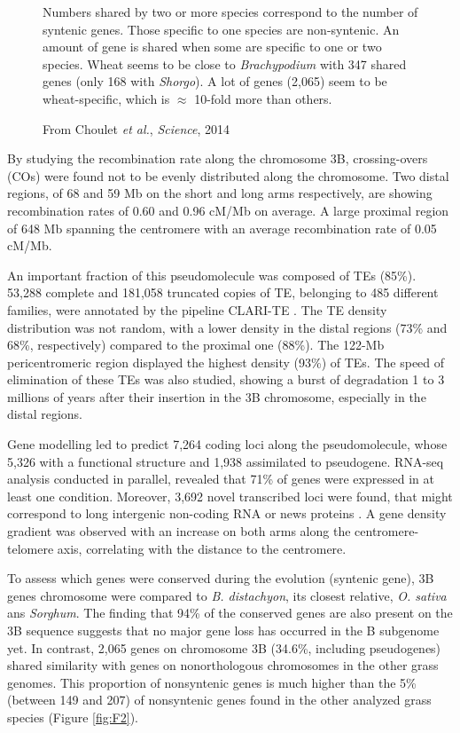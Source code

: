 \documentclass[a4paper, 12pt]{article}
\begin{document}
\begin{onehalfspace}
\begin{figure}
{    Numbers shared by two or more species correspond to the number of syntenic genes. Those specific to one species are non-syntenic. An amount of gene is shared when some are specific to one or two species. Wheat seems to be close to \textit{Brachypodium} with 347 shared genes (only 168 with \textit{Shorgo}). A lot of genes (2,065) seem to be wheat-specific, which is $\approx$ 10-fold more than others.
    
          \begin{flushright}
          From Choulet \textit{et al.}, \textit{Science}, 2014
          \end{flushright}}
    \end{figure}
\addtocounter{page}{-1}
\newpage
\clearpage %


By studying the recombination rate along the chromosome 3B, crossing-overs (COs) were found not to be evenly distributed along the chromosome. Two distal regions, of 68 and 59 Mb on the short and long arms respectively, are showing recombination rates of 0.60 and 0.96 cM/Mb on average. A large proximal region of 648 Mb spanning the centromere with an average recombination rate of 0.05 cM/Mb.

An important fraction of this pseudomolecule was composed of TEs (85\%). 53,288 complete and 181,058 truncated copies of TE, belonging to 485 different families, were annotated by the pipeline CLARI-TE \citep{Daron2014}. The TE density distribution was not random, with a lower density in the distal regions (73\% and 68\%, respectively) compared to the proximal one (88\%). The 122-Mb pericentromeric region displayed the highest density (93\%) of TEs. The speed of elimination of these TEs was also studied, showing a burst of degradation 1 to 3 millions of years after their insertion in the 3B chromosome, especially in the distal regions.

Gene modelling led to predict 7,264 coding loci along the pseudomolecule, whose 5,326 with a functional structure and 1,938 assimilated to pseudogene. RNA-seq analysis conducted in parallel, revealed that 71\% of genes were expressed in at least one condition. Moreover, 3,692 novel transcribed loci were found, that might correspond to long intergenic non-coding RNA or news proteins \citep{Choulet2k14}. A gene density gradient was observed with an increase on both arms along the centromere-telomere axis, correlating with the distance to the centromere.

To assess which genes were conserved during the evolution (syntenic gene), 3B genes chromosome were compared to \textit{B. distachyon}, its closest relative, \textit{O. sativa} ans \textit{Sorghum}. The finding that 94\% of the conserved genes are also present on the 3B sequence suggests that no major gene loss has occurred in the B subgenome yet. In contrast, 2,065 genes on chromosome 3B (34.6\%, including pseudogenes) shared similarity with genes on nonorthologous chromosomes in the other grass genomes. This proportion of nonsyntenic genes is much higher than the 5\% (between 149 and 207) of nonsyntenic genes found in the other analyzed grass species (Figure \ref{fig:F2}). 


\end{onehalfspace}
\end{document}
